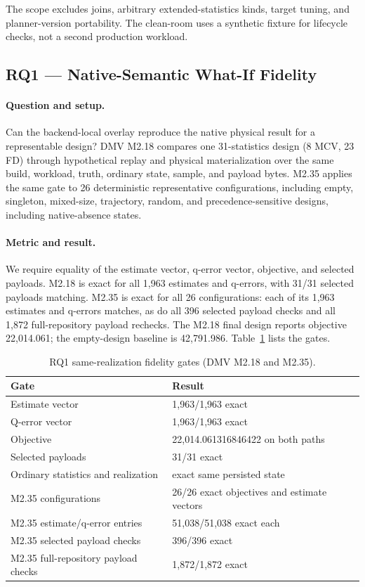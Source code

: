 The scope excludes joins, arbitrary extended-statistics kinds, target tuning,
and planner-version portability.  The clean-room uses a synthetic fixture for
lifecycle checks, not a second production workload.

\subsection{RQ1 --- Native-Semantic What-If Fidelity}

\paragraph{Question and setup.}
Can the backend-local overlay reproduce the native physical result for a
representable design?  DMV M2.18 compares one 31-statistics design (8 MCV,
23 FD) through hypothetical replay and physical materialization over the same
build, workload, truth, ordinary state, sample, and payload bytes.  M2.35
applies the same gate to 26 deterministic representative configurations,
including empty, singleton, mixed-size, trajectory, random, and
precedence-sensitive designs, including native-absence states.

\paragraph{Metric and result.}
We require equality of the estimate vector, q-error vector, objective, and
selected payloads.  M2.18 is exact for all 1,963 estimates and q-errors, with
31/31 selected payloads matching.  M2.35 is exact for all 26 configurations:
each of its 1,963 estimates and q-errors matches, as do all 396 selected
payload checks and all 1,872 full-repository payload rechecks.  The M2.18
final design reports objective 22,014.061; the empty-design baseline is
42,791.986.  Table~\ref{tab:rq1} lists the gates.

\begin{table}[t]
\caption{RQ1 same-realization fidelity gates (DMV M2.18 and M2.35).}
\label{tab:rq1}
\scriptsize
\begin{tabular}{@{}p{}p{}@{}}
\toprule
Gate & Result \\
\midrule
Estimate vector & 1,963/1,963 exact \\
Q-error vector & 1,963/1,963 exact \\
Objective & 22,014.061316846422 on both paths \\
Selected payloads & 31/31 exact \\
Ordinary statistics and realization & exact same persisted state \\
\addlinespace
M2.35 configurations & 26/26 exact objectives and estimate vectors \\
M2.35 estimate/q-error entries & 51,038/51,038 exact each \\
M2.35 selected payload checks & 396/396 exact \\
M2.35 full-repository payload checks & 1,872/1,872 exact \\
\bottomrule
\end{tabular}
\end{table}

